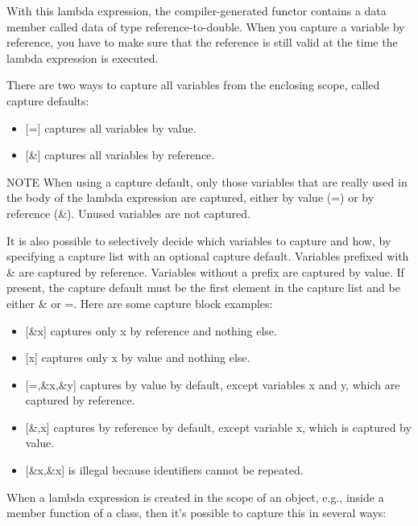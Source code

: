 With this lambda expression, the compiler-generated functor contains a data member called data of type reference-to-double. When you capture a variable by reference, you have to make sure that the reference is still valid at the time the lambda expression is executed.

There are two ways to capture all variables from the enclosing scope, called capture defaults:

\begin{itemize}
\item
{}[=] captures all variables by value.

\item
{}[\&] captures all variables by reference.
\end{itemize}

\begin{myNotic}{NOTE}
When using a capture default, only those variables that are really used in the body of the lambda expression are captured, either by value (=) or by reference (\&). Unused variables are not captured.
\end{myNotic}

It is also possible to selectively decide which variables to capture and how, by specifying a capture list with an optional capture default. Variables prefixed with \& are captured by reference. Variables without a prefix are captured by value. If present, the capture default must be the first element in the capture list and be either \& or =. Here are some capture block examples:

\begin{itemize}
\item
{}[\&x] captures only x by reference and nothing else.

\item
{}[x] captures only x by value and nothing else.

\item
{}[=,\&x,\&y] captures by value by default, except variables x and y, which are captured by reference.

\item
{}[\&,x] captures by reference by default, except variable x, which is captured by value.

\item
{}[\&x,\&x] is illegal because identifiers cannot be repeated.
\end{itemize}

When a lambda expression is created in the scope of an object, e.g., inside a member function of a class, then it’s possible to capture this in several ways:


